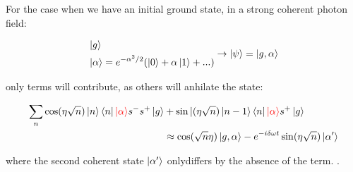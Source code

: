 	\noindent For the case when we have an initial ground state, in a strong coherent photon field:
	
	\begin{equation}\label{key}
		\begin{aligned}
			&\ket{g}\\
			&\ket{\alpha} = e^{-\alpha^2/2}(\ket{0} + \alpha\ket{1} + ...)
		\end{aligned}\rightarrow \ket{\psi} = \ket{g,\alpha}
	\end{equation}
	
	\noindent only  terms will contribute, as others will anhilate the  state:
	
	\begin{equation}\label{key}
		\begin{aligned}
			\sum_n\cos(\eta\sqrt{n})\ket{n}\bra{n}{\color{red}{\ket{\alpha}}}s^{-}s^{+}\ket{g} &+ \sin|(\eta\sqrt{n})\ket{n-1}\bra{n}{\color{red}{\ket{\alpha}}}s^{+}\ket{g}\\
			& \approx \cos(\sqrt{n}\eta)\ket{g,\alpha} - e^{-i\delta\omega t}\sin(\eta\sqrt{n})\ket{\alpha'}
					\end{aligned}
	\end{equation}
	
	\noindent where the second coherent state $ \ket{\alpha'} $ onlydiffers by the absence of the  term. .
	
